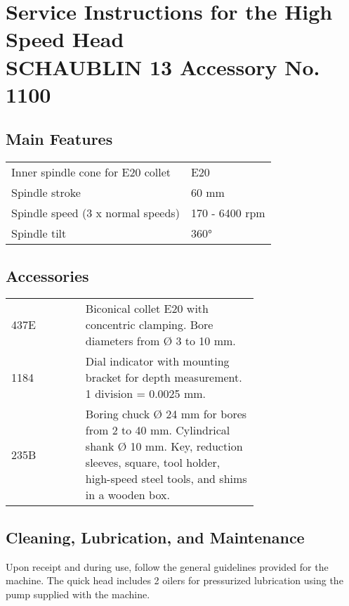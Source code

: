 \chapter{Service Instructions for the High Speed Head \\
SCHAUBLIN 13 \small{Accessory No. 1100}}

\section*{Main Features}
\begin{tabular}{@{}ll@{}}
    Inner spindle cone for E20 collet & E20            \\
    Spindle stroke                    & 60 mm          \\
    Spindle speed (3 x normal speeds) & 170 - 6400 rpm \\
    Spindle tilt                      & 360°           \\
\end{tabular}

\section*{Accessories}
\begin{tabular}{@{}lp{0.7\linewidth}@{}}
    437E & Biconical collet E20 with concentric clamping. Bore diameters from Ø 3 to 10 mm.                                                                                           \\
    1184 & Dial indicator with mounting bracket for depth measurement. 1 division = 0.0025 mm.                                                                                        \\
    235B & Boring chuck Ø 24 mm for bores from 2 to 40 mm. Cylindrical shank Ø 10 mm. Key, reduction sleeves, square, tool holder, high-speed steel tools, and shims in a wooden box. \\
\end{tabular}

\section*{Cleaning, Lubrication, and Maintenance}
Upon receipt and during use, follow the general guidelines provided for the machine. The quick head includes 2 oilers for pressurized lubrication using the pump supplied with the machine.

